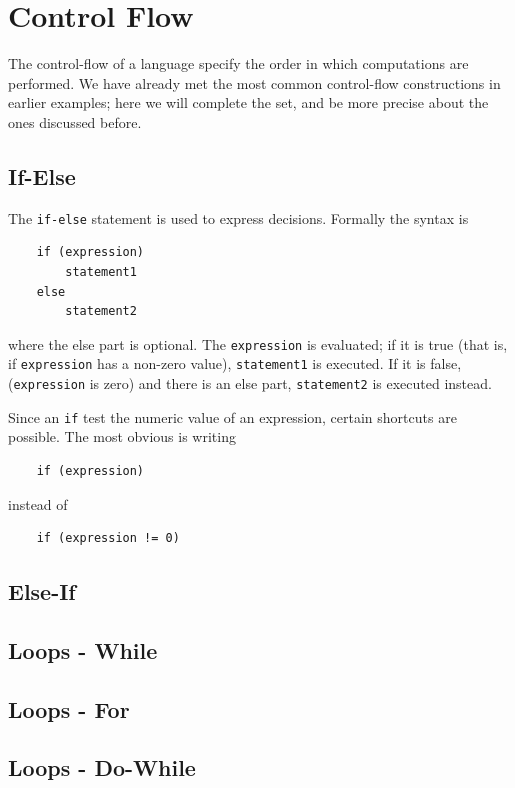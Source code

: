 \documentclass{scrartcl}
\begin{document}
    \section{Control Flow}
        The control-flow of a language specify the order in which computations
        are performed. We have already met the most common control-flow constructions
        in earlier examples; here we will complete the set, and be more precise
        about the ones discussed before.
        \subsection{If-Else}
            The \texttt{if-else} statement is used to express decisions. Formally
            the syntax is
            \begin{lstlisting}
    if (expression)
        statement1
    else
        statement2
            \end{lstlisting}
            where the else part is optional. The \texttt{expression} is evaluated;
            if it is true (that is, if \texttt{expression} has a non-zero value),
            \texttt{statement1} is executed. If it is false, (\texttt{expression} is zero)
            and there is an else part, \texttt{statement2} is executed instead.

            Since an \texttt{if} test the numeric value of an expression, certain
            shortcuts are possible. The most obvious is writing
            \begin{lstlisting}
    if (expression)
            \end{lstlisting}
            instead of
            \begin{lstlisting}
    if (expression != 0)
            \end{lstlisting}

        \subsection{Else-If}
        \subsection{Loops - While}
        \subsection{Loops - For}
        \subsection{Loops - Do-While}
\end{document}
